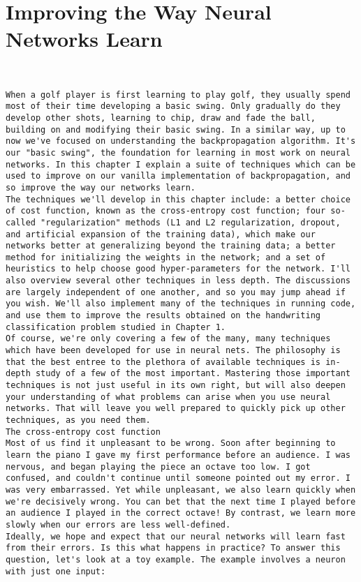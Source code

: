 
\chapter{Improving the Way Neural Networks Learn}
\label{sec:ImprovingTheWayNeuralNetworksLearn}

\begin{lstlisting}


When a golf player is first learning to play golf, they usually spend most of their time developing a basic swing. Only gradually do they develop other shots, learning to chip, draw and fade the ball, building on and modifying their basic swing. In a similar way, up to now we've focused on understanding the backpropagation algorithm. It's our "basic swing", the foundation for learning in most work on neural networks. In this chapter I explain a suite of techniques which can be used to improve on our vanilla implementation of backpropagation, and so improve the way our networks learn.
The techniques we'll develop in this chapter include: a better choice of cost function, known as the cross-entropy cost function; four so-called "regularization" methods (L1 and L2 regularization, dropout, and artificial expansion of the training data), which make our networks better at generalizing beyond the training data; a better method for initializing the weights in the network; and a set of heuristics to help choose good hyper-parameters for the network. I'll also overview several other techniques in less depth. The discussions are largely independent of one another, and so you may jump ahead if you wish. We'll also implement many of the techniques in running code, and use them to improve the results obtained on the handwriting classification problem studied in Chapter 1.
Of course, we're only covering a few of the many, many techniques which have been developed for use in neural nets. The philosophy is that the best entree to the plethora of available techniques is in-depth study of a few of the most important. Mastering those important techniques is not just useful in its own right, but will also deepen your understanding of what problems can arise when you use neural networks. That will leave you well prepared to quickly pick up other techniques, as you need them.
The cross-entropy cost function
Most of us find it unpleasant to be wrong. Soon after beginning to learn the piano I gave my first performance before an audience. I was nervous, and began playing the piece an octave too low. I got confused, and couldn't continue until someone pointed out my error. I was very embarrassed. Yet while unpleasant, we also learn quickly when we're decisively wrong. You can bet that the next time I played before an audience I played in the correct octave! By contrast, we learn more slowly when our errors are less well-defined.
Ideally, we hope and expect that our neural networks will learn fast from their errors. Is this what happens in practice? To answer this question, let's look at a toy example. The example involves a neuron with just one input:


\end{lstlisting}
